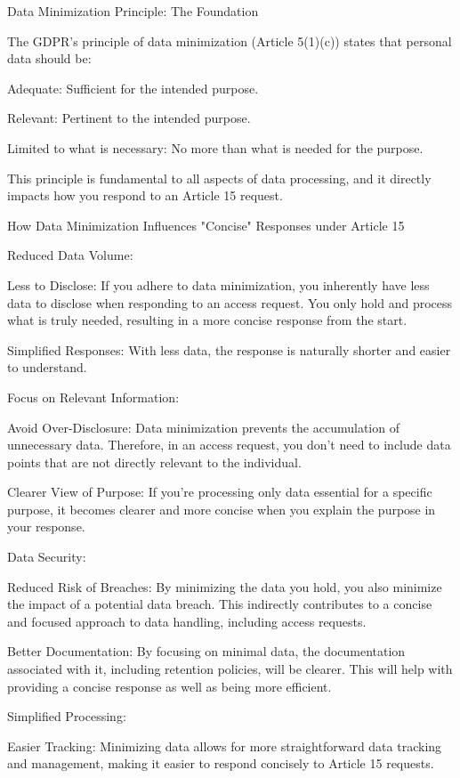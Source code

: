 Data Minimization Principle: The Foundation

The GDPR's principle of data minimization (Article 5(1)(c)) states that personal data should be:

    Adequate: Sufficient for the intended purpose.

    Relevant: Pertinent to the intended purpose.

    Limited to what is necessary: No more than what is needed for the purpose.

This principle is fundamental to all aspects of data processing, and it directly impacts how you respond to an Article 15 request.

How Data Minimization Influences "Concise" Responses under Article 15

    Reduced Data Volume:

        Less to Disclose: If you adhere to data minimization, you inherently have less data to disclose when responding to an access request. You only hold and process what is truly needed, resulting in a more concise response from the start.

        Simplified Responses: With less data, the response is naturally shorter and easier to understand.

    Focus on Relevant Information:

        Avoid Over-Disclosure: Data minimization prevents the accumulation of unnecessary data. Therefore, in an access request, you don't need to include data points that are not directly relevant to the individual.

        Clearer View of Purpose: If you're processing only data essential for a specific purpose, it becomes clearer and more concise when you explain the purpose in your response.

    Data Security:

        Reduced Risk of Breaches: By minimizing the data you hold, you also minimize the impact of a potential data breach. This indirectly contributes to a concise and focused approach to data handling, including access requests.

        Better Documentation: By focusing on minimal data, the documentation associated with it, including retention policies, will be clearer. This will help with providing a concise response as well as being more efficient.

    Simplified Processing:

        Easier Tracking: Minimizing data allows for more straightforward data tracking and management, making it easier to respond concisely to Article 15 requests.

